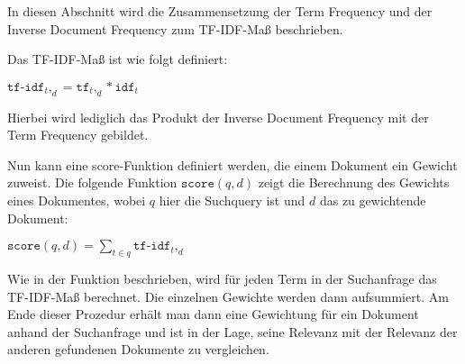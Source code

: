 In diesen Abschnitt wird die Zusammensetzung der Term Frequency und der Inverse Document Frequency zum TF-IDF-Maß beschrieben. 

\begin{defi}[TF-IDF]\cite[S. 119]{IR_Intro_Cambridge}\label{defi:TF-IDF}
	Das TF-IDF-Maß ist wie folgt definiert:
	\begin{center}
		$\displaystyle \mathtt{tf\text{-}idf}_t,_d = \mathtt{tf}_t,_d * \mathtt{idf}_t$
	\end{center}
	Hierbei wird lediglich das Produkt der Inverse Document Frequency mit der Term Frequency gebildet.
\end{defi}

Nun kann eine score-Funktion definiert werden, die einem Dokument ein Gewicht zuweist. Die folgende Funktion $\mathtt{score}(q,d)$ zeigt die Berechnung des Gewichts eines Dokumentes, wobei $q$ hier die Suchquery ist und $d$ das zu gewichtende Dokument:\cite[S. 119]{IR_Intro_Cambridge} 
\begin{center}
	$\displaystyle \mathtt{score}(q,d)=\sum\limits_{t \in q}\mathtt{tf\text{-}idf}_t,_d$
\end{center}
\newpage
Wie in der Funktion beschrieben, wird für jeden Term in der Suchanfrage das TF-IDF-Maß berechnet. Die einzelnen Gewichte werden dann aufsummiert. Am Ende dieser Prozedur erhält man dann eine Gewichtung für ein Dokument anhand der Suchanfrage und ist in der Lage, seine Relevanz mit der Relevanz der anderen gefundenen Dokumente zu vergleichen.
